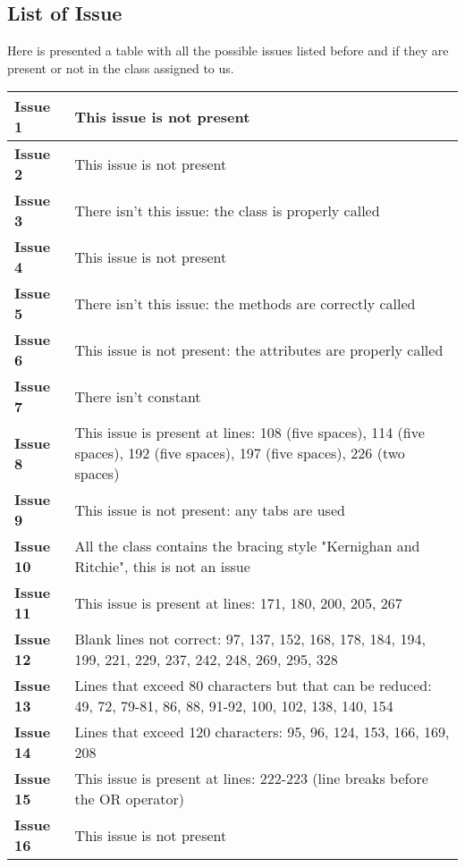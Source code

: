 \subsection{List of Issue}
Here is presented a table with all the possible issues listed before and if they are present or not in the class assigned to us.
\begin{table}[htbp]
\begin{center}
\renewcommand{\arraystretch}{1.5}
\begin{tabular}{l|p{}}
\hline
\textbf{Issue 1} & This issue is not present\\
\hline
\textbf{Issue 2} & This issue is not present\\
\hline
\textbf{Issue 3} & There isn't this issue: the class is properly called \\
\hline
\textbf{Issue 4} & This issue is not present\\
\hline
\textbf{Issue 5} & There isn't this issue: the methods are correctly called\\
\hline
\textbf{Issue 6} & This issue is not present: the attributes are properly called\\
\hline
\textbf{Issue 7} & There isn't constant\\
\hline
\textbf{Issue 8} & This issue is present at lines: 108 (five spaces), 114 (five spaces), 192 (five spaces), 197 (five spaces), 226 (two spaces)\\
\hline
\textbf{Issue 9} & This issue is not present: any tabs are used\\
\hline
\textbf{Issue 10} & All the class contains the bracing style "Kernighan and Ritchie", this is not an issue\\
\hline
\textbf{Issue 11} & This issue is present at lines: 171, 180, 200, 205, 267\\
\hline
\textbf{Issue 12} & Blank lines not correct: 97, 137, 152, 168, 178, 184, 194, 199, 221, 229, 237, 242, 248, 269, 295, 328\\
\hline
\textbf{Issue 13} & Lines that exceed 80 characters but that can be reduced: 49, 72, 79-81, 86, 88, 91-92, 100, 102, 138, 140, 154\\
\hline
\textbf{Issue 14} & Lines that exceed 120 characters: 95, 96, 124, 153, 166, 169, 208\\
\hline
\textbf{Issue 15} & This issue is present at lines: 222-223 (line breaks before the OR operator) \\
\hline
\textbf{Issue 16} & This issue is not present\\

\end{tabular}
\end{center}
\end{table}
